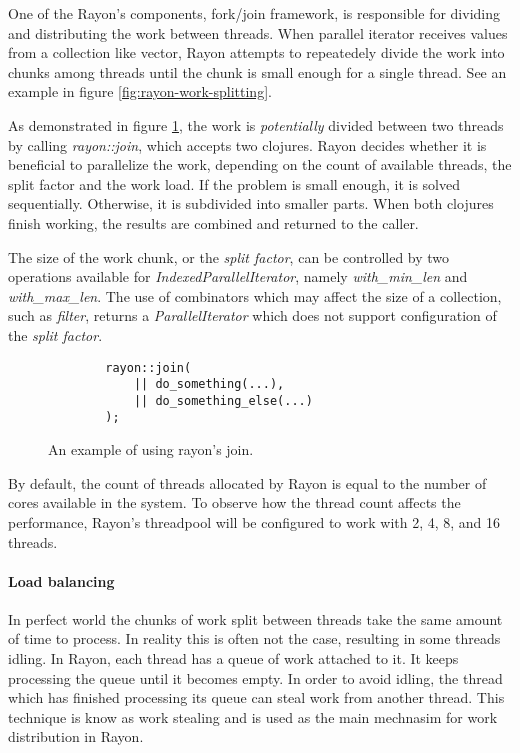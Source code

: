 One of the Rayon's components, fork/join framework, is responsible for dividing and distributing the work between threads. When parallel iterator receives values from a collection like vector, Rayon attempts to repeatedely divide the work into chunks among threads until the chunk is small enough for a single thread. See an example in figure \ref{fig:rayon-work-splitting}.

As demonstrated in figure \ref{fig:rayon-join}, the work is \emph{potentially} divided between two threads by calling \emph{rayon::join}, which accepts two clojures. Rayon decides whether it is beneficial to parallelize the work, depending on the count of available threads, the split factor and the work load. If the problem is small enough, it is solved sequentially. Otherwise, it is subdivided into smaller parts. When both clojures finish working, the results are combined and returned to the caller. 

The size of the work chunk, or the \emph{split factor}, can be controlled by two operations available for \emph{IndexedParallelIterator}, namely \emph{with\_min\_len} and \emph{with\_max\_len}. The use of combinators which may affect the size of a collection, such as \emph{filter}, returns a \emph{ParallelIterator} which does not support configuration of the \emph{split factor}. 

\begin{figure}[!htbp]
    \centering

    \begin{verbatim}
        rayon::join(
            || do_something(...),
            || do_something_else(...)
        );
    \end{verbatim}
    
    \caption{An example of using rayon's join.}
    \label{fig:rayon-join}
\end{figure}

By default, the count of threads allocated by Rayon is equal to the number of cores available in the system. To observe how the thread count affects the performance, Rayon's threadpool will be configured to work with 2, 4, 8, and 16 threads. 

\paragraph*{Load balancing}
In perfect world the chunks of work split between threads take the same amount of time to process. In reality this is often not the case, resulting in some threads idling. In Rayon, each thread has a queue of work attached to it. It keeps processing the queue until it becomes empty. In order to avoid idling, the thread which has finished processing its queue can steal work from another thread. This technique is know as work stealing and is used as the main mechnasim for work distribution in Rayon. 

